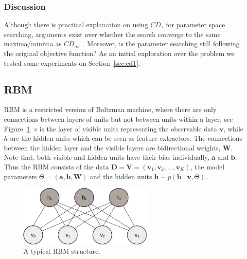 \subsubsection{Discussion}
Although there is practical explanation on using $CD_1$ for parameter space searching, arguments exist over whether the search converge to the same maxima/minima as $CD_\infty$~\cite{wu2015bias}.
Moreover, is the parameter searching still following the original objective function?	
As an initial exploration over the problem we tested some experiments on Section~\ref{sec:cd1}. 
\subsection{RBM\cite{zhang2013rbm}}
RBM is a restricted version of Boltzman machine, where there are only connections between layers of units but not between units within a layer, see Figure~\ref{fig:RBM}.
$ v $ is the layer of visible units representing the observable data $ \mathbf{v} $, while $ h $ are the hidden units which can be seen as feature extractors.
The connections between the hidden layer and the visible layers are bidirectional weights, $ \mathbf{W} $.
Note that, both visible and hidden units have their bias individually, $ \mathbf{a} $ and $ \mathbf{b} $.
Thus the RBM consists of the data $ \mathbf{D} = \mathbf{V} = (\mathbf{v}_1, \mathbf{v}_2, ..., \mathbf{v}_K ) $, the model parameters $ \Theta = (\mathbf{a}, \mathbf{b}, \mathbf{W}) $ and the hidden units $ \mathbf{h} \sim p(\mathbf{h} \mid \mathbf{v}, \Theta) $.
\begin{figure}[hbt]
	\centering
	\includegraphics[width=0.6\textwidth]{pics_sdbn/RBM.pdf}
	\caption{A typical RBM structure.}
	\label{fig:RBM}
\end{figure}

